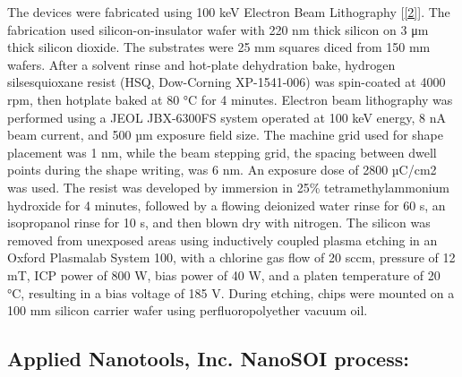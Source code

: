 The devices were fabricated using 100 keV Electron Beam Lithography
{[}\hyperref[csl:2]{[2]}{]}. The fabrication used silicon-on-insulator
wafer with 220 nm thick silicon on 3 μm thick silicon dioxide. The
substrates were 25 mm squares diced from 150 mm wafers. After a solvent
rinse and hot-plate dehydration bake, hydrogen silsesquioxane resist
(HSQ, Dow-Corning XP-1541-006) was spin-coated at 4000 rpm, then
hotplate baked at 80 °C for 4 minutes. Electron beam lithography was
performed using a JEOL JBX-6300FS system operated at 100 keV energy, 8
nA beam current, and 500 µm exposure field size. The machine grid used
for shape placement was 1 nm, while the beam stepping grid, the spacing
between dwell points during the shape writing, was 6 nm. An exposure
dose of 2800 µC/cm2 was used. The resist was developed by immersion in
25\% tetramethylammonium hydroxide for 4 minutes, followed by a flowing
deionized water rinse for 60 s, an isopropanol rinse for 10 s, and then
blown dry with nitrogen. The silicon was removed from unexposed areas
using inductively coupled plasma etching in an Oxford Plasmalab System
100, with a chlorine gas flow of 20 sccm, pressure of 12 mT, ICP power
of 800 W, bias power of 40 W, and a platen temperature of 20 °C,
resulting in a bias voltage of 185 V. During etching, chips were mounted
on a 100 mm silicon carrier wafer using perfluoropolyether vacuum oil.\\

\subsection{Applied Nanotools, Inc. NanoSOI
process:}\label{auto-label-subsection-267018}

